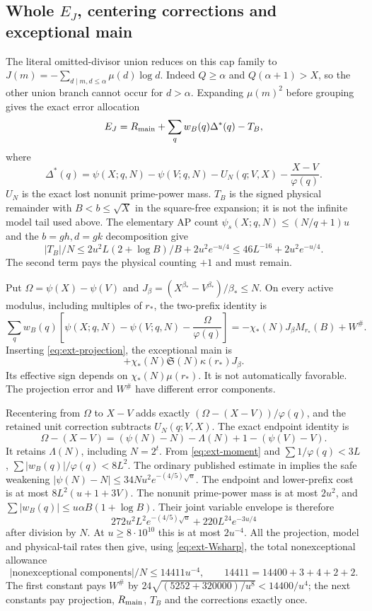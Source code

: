 \documentclass[11pt,a4paper]{article}
\theoremstyle{definition}
\theoremstyle{remark}
\begin{document}
\subsection{Whole $E_J$, centering corrections and exceptional main}

The literal omitted-divisor union reduces on this cap family to
$J(m)=-\sum_{d\mid m,d\leq\alpha}\mu(d)\log d$.
Indeed $Q\geq\alpha$ and $Q(\alpha+1)>X$, so the other union
branch cannot occur for $d>\alpha$. Expanding $\mu(m)^2$ before
grouping gives the exact error allocation
\[
 E_J=R_{\rm main}+\sum_qw_B(q)\Delta^*(q)-T_B,
\]
where
\[
 \Delta^*(q)=\psi(X;q,N)-\psi(V;q,N)-U_N(q;V,X)
                                -\frac{X-V}{\varphi(q)}.
\]
$U_N$ is the exact lost nonunit prime-power mass. $T_B$ is the
signed physical remainder with $B<b\leq\sqrt X$ in the square-free
expansion; it is not the infinite model tail used above.
The elementary AP count $\psi_s(X;q,N)\leq(N/q+1)u$ and the
$b=gh,d=gk$ decomposition give
\[
 |T_B|/N\leq2u^2L(2+\log B)/B+2u^2e^{-u/4}
                     \leq46L^{-16}+2u^2e^{-u/4}.
\]
The second term pays the physical counting $+1$ and must remain.

Put $\Omega=\psi(X)-\psi(V)$ and
$J_\beta=(X^{\beta_*}-V^{\beta_*})/\beta_*\leq N$.
On every active modulus, including multiples of $r_*$,
the two-prefix identity is
\[
 \sum_qw_B(q)\left[\psi(X;q,N)-\psi(V;q,N)
                            -\frac\Omega{\varphi(q)}\right]
   =-\chi_*(N)J_\beta M_{r_*}(B)+W^\#.
\]
Inserting \eqref{eq:ext-projection}, the exceptional main is
\[
       +\chi_*(N)\mathfrak S(N)\kappa(r_*)J_\beta.
\]
Its effective sign depends on $\chi_*(N)\mu(r_*)$. It is not
automatically favorable. The projection error and $W^\#$ have
different error components.

Recentering from $\Omega$ to $X-V$ adds exactly
$(\Omega-(X-V))/\varphi(q)$, and the retained unit correction
subtracts $U_N(q;V,X)$. The exact endpoint identity is
\[
 \Omega-(X-V)=(\psi(N)-N)-\Lambda(N)+1-(\psi(V)-V).
\]
It retains $\Lambda(N)$, including $N=2^t$. From
\eqref{eq:ext-moment} and $\sum1/\varphi(q)<3L$,
$\sum|w_B(q)|/\varphi(q)<8L^2$.
The ordinary published estimate in \cite{JY} implies the safe
weakening $|\psi(N)-N|\leq34Nu^2e^{-(4/5)\sqrt u}$.
The endpoint and lower-prefix cost is at most $8L^2(u+1+3V)$.
The nonunit prime-power mass is at most $2u^2$, and
$\sum|w_B(q)|\leq u\alpha B(1+\log B)$.
Their joint variable envelope is therefore
\[
 272u^2L^2e^{-(4/5)\sqrt u}+220L^{24}e^{-3u/4}
\]
after division by $N$. At $u\geq8\cdot10^{10}$ this is at most
$2u^{-4}$. All the projection, model and physical-tail rates then
give, using \eqref{eq:ext-Wsharp}, the total nonexceptional allowance
\[
 |\text{nonexceptional components}|/N\leq14411u^{-4},
 \qquad14411=14400+3+4+2+2.
\]
The first constant pays $W^\#$ by
$24\sqrt{(5252+320000)/u^8}<14400/u^4$; the next constants pay
projection, $R_{\rm main}$, $T_B$ and the corrections exactly once.
\end{document}
